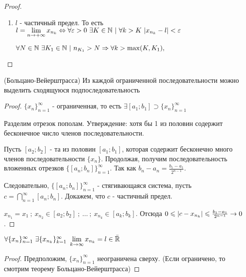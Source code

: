 \begin{proof}
\begin{enumerate}
	\item $l$ - частичный предел. То есть $l = \lim\limits_{n \rightarrow +\infty} x_{n_k} \Leftrightarrow \forall \varepsilon > 0\ \exists K \in \mathbb{N}\ |\ \forall k > K\ |x_{n_k} - l| < \varepsilon$
	
	$\forall N \in \N\ \exists K_1 \in \N\ |\ n_{K_1} > N \Ra \forall k > \max(K, K_1), $
	
\end{enumerate}
\end{proof}

\begin{theorem} (Больцано-Вейерштрасса)
	Из каждой ограниченной последовательности можно выделить сходящуюся подпоследовательность
\end{theorem}

\begin{proof}
	$\{x_n\}_{n = 1}^\infty$ - ограниченная, то есть $\exists [a_1; b_1] \supset \{x_n\}_{n = 1}^\infty$
	
	Разделим отрезок пополам. Утверждение: хотя бы 1 из половин содержит бесконечное число членов последовательности.
	
	Пусть $[a_2; b_2]$ - та из половин $[a_1; b_1]$, которая содержит бесконечно много членов последовательности $\{x_n\}$. Продолжая, получим последовательность вложенных отрезков $\{[a_n; b_n]\}_{n = 1}^\infty$. Так как $b_n - a_n = \frac{b_1 - a_1}{2^{n - 1}}$.
	
	Следовательно, $\{[a_n; b_n]\}_{n = 1}^\infty$ - стягивающаяся система, пусть $c = \bigcap\limits_{n = 1}^\infty [a_n; b_n]$. Докажем, что $c$ - частичный предел.
	
	$x_{n_1} = x_1\ ;\ x_{n_2} \in [a_2; b_2]\ ;\ \dots\ ;\ x_{n_k} \in [a_k; b_k]$. Отсюда $0 \leqslant |c - x_{n_k}| \leqslant \frac{b_1 - a_1}{2^{n - 1}} \rightarrow 0$.
\end{proof}

\begin{addition}
	$\forall \{x_n\}_{n = 1}^\infty\ \exists \{x_{n_k}\}_{k = 1}^\infty\ \lim\limits_{k \rightarrow \infty} x_{n_k} = l \in \bar{\mathbb{R}}$
\end{addition}

\begin{proof}
	Предположим, $\{x_n\}_{n = 1}^\infty$ неограничена сверху. (Если ограничено, то смотрим теорему Больцано-Вейерштрасса)
\end{proof}

